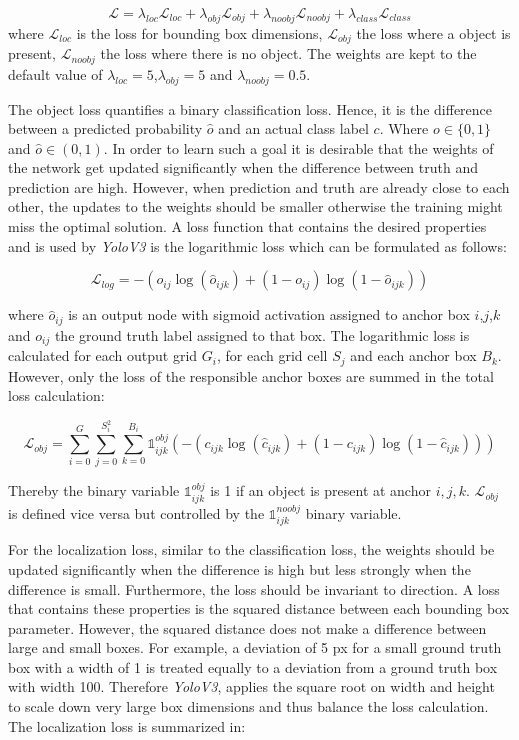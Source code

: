	\begin{equation}
	\mathcal{L} = \lambda_{loc}\mathcal{L}_{loc} + \lambda_{obj}\mathcal{L}_{obj} + \lambda_{noobj}\mathcal{L}_{noobj} + \lambda_{class}\mathcal{L}_{class}
	\end{equation}
	where $\mathcal{L}_{loc}$ is the loss for bounding box dimensions, $\mathcal{L}_{obj}$ the loss where a object is present, $\mathcal{L}_{noobj}$ the loss where there is no object. The weights are kept to the default value of $\lambda_{loc} = 5$,$\lambda_{obj} = 5$ and $\lambda_{noobj} = 0.5$.
	
	The object loss quantifies a binary classification loss. Hence, it is the difference between a predicted probability $\hat o$ and an actual class label $c$. Where $o \in \{0,1\}$ and $\hat o \in (0,1)$. In order to learn such a goal it is desirable that the weights of the network get updated significantly when the difference between truth and prediction are high. However, when prediction and truth are already close to each other, the updates to the weights should be smaller otherwise the training might miss the optimal solution. A loss function that contains the desired properties and is used by \textit{YoloV3} is the logarithmic loss which can be formulated as follows:
	
	\begin{equation}
		\mathcal{L}_{log} = -(o_{ij}\log(\hat o_{ijk}) + (1 - o_{ij})\log(1 - \hat o_{ijk}))
	\end{equation}
	
	where $\hat o_{ij}$ is an output node with sigmoid activation assigned to anchor box $i$,$j$,$k$ and $ o_{ij}$ the ground truth label assigned to that box. The logarithmic loss is calculated for each output grid $G_i$, for each grid cell $S_j$ and each anchor box $B_k$. However, only the loss of the responsible anchor boxes are summed in the total loss calculation:
	
	\begin{equation}
		\mathcal{L}_{obj} = \sum_{i=0}^{G}\sum_{j=0}^{S_i^2}\sum_{k=0}^{B_i} \mathbb{1}_{ijk}^{obj}(-(c_{ijk}\log(\hat c_{ijk}) + (1 - c_{ijk})\log(1 - \hat c_{ijk})))
	\end{equation}
	
	Thereby the  binary variable $\mathbb{1}_{ijk}^{obj}$ is 1 if an object is present at anchor $i,j,k$. $\mathcal{L}_{obj}$ is defined vice versa but controlled by the $\mathbb{1}_{ijk}^{noobj}$ binary variable.

	For the localization loss, similar to the classification loss, the weights should be updated significantly when the difference is high but less strongly when the difference is small. Furthermore, the loss should be invariant to direction. A loss that contains these properties is the squared distance between each bounding box parameter. However, the squared distance does not make a difference between large and small boxes. For example, a deviation of 5 px for a small ground truth box with a width of 1 is treated equally to a deviation from a ground truth box with width 100. Therefore \textit{YoloV3}, applies the square root on width and height to scale down very large box dimensions and thus balance the loss calculation. The localization loss is summarized in:
	
